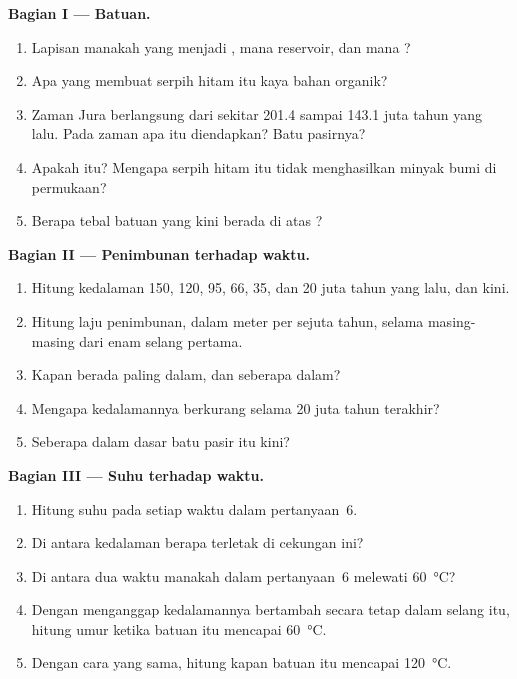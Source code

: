 \begin{problem}
\medskip
\noindent\textbf{Bagian I --- Batuan.}
\begin{enumerate}
  \item Lapisan manakah yang menjadi , mana reservoir, dan mana
        ?
  \item Apa yang membuat serpih hitam itu kaya bahan organik?
  \item Zaman Jura berlangsung dari sekitar \num{201.4} sampai \num{143.1} juta
        tahun yang lalu. Pada zaman apa  itu diendapkan? Batu
        pasirnya?
  \item Apakah  itu? Mengapa serpih hitam itu tidak menghasilkan minyak
        bumi di permukaan?
  \item Berapa tebal batuan yang kini berada di atas ?
\end{enumerate}

\medskip
\noindent\textbf{Bagian II --- Penimbunan terhadap waktu.}
\begin{enumerate}[resume]
  \item Hitung kedalaman  150, 120, 95, 66, 35, dan 20 juta tahun
        yang lalu, dan kini.
  \item Hitung laju penimbunan, dalam meter per sejuta tahun, selama
        masing-masing dari enam selang pertama.
  \item Kapan  berada paling dalam, dan seberapa dalam?
  \item Mengapa kedalamannya berkurang selama 20 juta tahun terakhir?
  \item Seberapa dalam dasar batu pasir itu kini?
\end{enumerate}

\medskip
\noindent\textbf{Bagian III --- Suhu terhadap waktu.}
\begin{enumerate}[resume]
  \item Hitung suhu  pada setiap waktu dalam pertanyaan~6.
  \item Di antara kedalaman berapa  terletak di cekungan ini?
  \item Di antara dua waktu manakah dalam pertanyaan~6  melewati
        \qty{60}{\degreeCelsius}?
  \item Dengan menganggap kedalamannya bertambah secara tetap dalam selang itu,
        hitung umur ketika batuan itu mencapai \qty{60}{\degreeCelsius}.
  \item Dengan cara yang sama, hitung kapan batuan itu mencapai
        \qty{120}{\degreeCelsius}.
\end{enumerate}


\end{problem}
